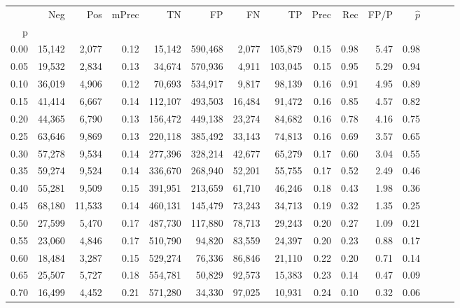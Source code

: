 \begin{tabular}{rrrrrrrrrrrrrrr}
\toprule
{} &     Neg &     Pos & mPrec &       TN &       FP &       FN &       TP &  Prec &   Rec &  FP/P & $\hat{p}$ \\
p    &         &         &       &          &          &          &          &       &       &       &           \\
\midrule
0.00 &  15,142 &   2,077 &  0.12 &   15,142 &  590,468 &    2,077 &  105,879 &  0.15 &  0.98 &  5.47 &      0.98 \\
0.05 &  19,532 &   2,834 &  0.13 &   34,674 &  570,936 &    4,911 &  103,045 &  0.15 &  0.95 &  5.29 &      0.94 \\
0.10 &  36,019 &   4,906 &  0.12 &   70,693 &  534,917 &    9,817 &   98,139 &  0.16 &  0.91 &  4.95 &      0.89 \\
0.15 &  41,414 &   6,667 &  0.14 &  112,107 &  493,503 &   16,484 &   91,472 &  0.16 &  0.85 &  4.57 &      0.82 \\
0.20 &  44,365 &   6,790 &  0.13 &  156,472 &  449,138 &   23,274 &   84,682 &  0.16 &  0.78 &  4.16 &      0.75 \\
0.25 &  63,646 &   9,869 &  0.13 &  220,118 &  385,492 &   33,143 &   74,813 &  0.16 &  0.69 &  3.57 &      0.65 \\
0.30 &  57,278 &   9,534 &  0.14 &  277,396 &  328,214 &   42,677 &   65,279 &  0.17 &  0.60 &  3.04 &      0.55 \\
0.35 &  59,274 &   9,524 &  0.14 &  336,670 &  268,940 &   52,201 &   55,755 &  0.17 &  0.52 &  2.49 &      0.46 \\
0.40 &  55,281 &   9,509 &  0.15 &  391,951 &  213,659 &   61,710 &   46,246 &  0.18 &  0.43 &  1.98 &      0.36 \\
0.45 &  68,180 &  11,533 &  0.14 &  460,131 &  145,479 &   73,243 &   34,713 &  0.19 &  0.32 &  1.35 &      0.25 \\
0.50 &  27,599 &   5,470 &  0.17 &  487,730 &  117,880 &   78,713 &   29,243 &  0.20 &  0.27 &  1.09 &      0.21 \\
0.55 &  23,060 &   4,846 &  0.17 &  510,790 &   94,820 &   83,559 &   24,397 &  0.20 &  0.23 &  0.88 &      0.17 \\
0.60 &  18,484 &   3,287 &  0.15 &  529,274 &   76,336 &   86,846 &   21,110 &  0.22 &  0.20 &  0.71 &      0.14 \\
0.65 &  25,507 &   5,727 &  0.18 &  554,781 &   50,829 &   92,573 &   15,383 &  0.23 &  0.14 &  0.47 &      0.09 \\
0.70 &  16,499 &   4,452 &  0.21 &  571,280 &   34,330 &   97,025 &   10,931 &  0.24 &  0.10 &  0.32 &      0.06 \\

\end{tabular}
